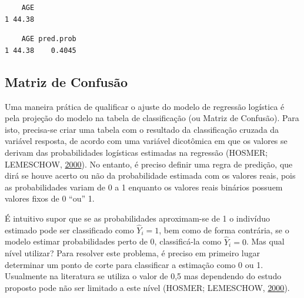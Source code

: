 \documentclass[12pt,brazil,oneside]{book}
\newenvironment{Shaded}{\begin{snugshade}}{\end{snugshade}}
\newcommand{\DataTypeTok}[1]{\textcolor[rgb]{0.13,0.29,0.53}{#1}}
\newcommand{\KeywordTok}[1]{\textcolor[rgb]{0.13,0.29,0.53}{\textbf{#1}}}
\newcommand{\NormalTok}[1]{#1}
\newcommand{\OperatorTok}[1]{\textcolor[rgb]{0.81,0.36,0.00}{\textbf{#1}}}
\newcommand{\StringTok}[1]{\textcolor[rgb]{0.31,0.60,0.02}{#1}}
\begin{document}
\begin{Shaded}
\end{Shaded}

\begin{verbatim}
    AGE
1 44.38
\end{verbatim}

\begin{Shaded}
\end{Shaded}

\begin{verbatim}
    AGE pred.prob
1 44.38    0.4045
\end{verbatim}

\hypertarget{matriz-de-confusao}{%
\subsection{Matriz de Confusão}\label{matriz-de-confusao}}

Uma maneira prática de qualificar o ajuste do modelo de regressão logística é pela projeção do modelo na tabela de classificação (ou Matriz de Confusão). Para isto, precisa-se criar uma tabela com o resultado da classificação cruzada da variável resposta, de acordo com uma variável dicotômica em que os valores se derivam das probabilidades logísticas estimadas na regressão (HOSMER; LEMESCHOW, \protect\hyperlink{ref-Hosmer2000}{2000}). No entanto, é preciso definir uma regra de predição, que dirá se houve acerto ou não da probabilidade estimada com os valores reais, pois as probabilidades variam de 0 a 1 enquanto os valores reais binários possuem valores fixos de 0 ``ou'' 1.

É intuitivo supor que se as probabilidades aproximam-se de 1 o indivíduo estimado pode ser classificado como \(\hat Y_i=1\), bem como de forma contrária, se o modelo estimar probabilidades perto de 0, classificá-la como \(\hat Y_i=0\). Mas qual nível utilizar? Para resolver este problema, é preciso em primeiro lugar determinar um ponto de corte para classificar a estimação como 0 ou 1. Usualmente na literatura se utiliza o valor de 0,5 mas dependendo do estudo proposto pode não ser limitado a este nível (HOSMER; LEMESCHOW, \protect\hyperlink{ref-Hosmer2000}{2000}).
\end{document}
